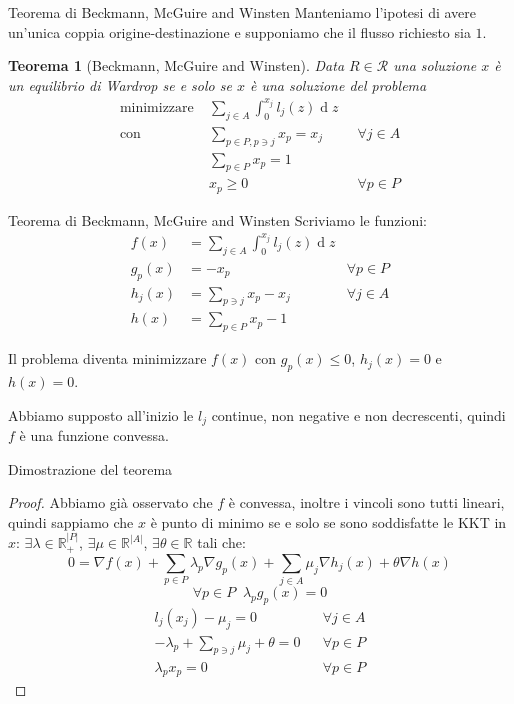 \documentclass{beamer}
\newcounter{counter1}
\theoremstyle{plain}
\newtheorem{myteo}[counter1]{Teorema}
\theoremstyle{definition}
\theoremstyle{remark}
\newcommand{\abs}[1]{\left|#1\right|}
\DeclareMathOperator{\de}{d}
\begin{document}
\begin{frame}{Teorema di Beckmann, McGuire and Winsten}
  Manteniamo l'ipotesi di avere un'unica coppia origine-destinazione e
  supponiamo che il flusso richiesto sia $1$.
  \begin{myteo}[Beckmann, McGuire and Winsten]
    Data $R\in \mathcal{R}$ una soluzione $x$ è un equilibrio di
    Wardrop se e solo se $x$ è una soluzione del problema
    \begin{align*}
        \text{minimizzare} \;&  \sum _{j\in A} \int _0 ^ {x_j}
        l_j(z)\de z \\
        \text{con} \;& \sum _{p\in P, p\ni j} x_p = x_j&\;\; \forall j\in
        A\\
        & \sum _{p\in P} x_p = 1 \\
        & x_p \ge 0&\;\;\forall p\in P        
    \end{align*}
  \end{myteo}
\end{frame}

\begin{frame}{Teorema di Beckmann, McGuire and Winsten}
  Scriviamo le funzioni:
  \begin{align*}
    f(x) &= \sum _{j\in A} \int _0 ^ {x_j} l_j(z)\de z \\
    g_p(x) &= -x_p & \forall p\in P \\
    h_j(x) &= \sum _{p\ni j} x_p -x_j & \forall j\in A\\
    h(x) &= \sum _{p\in P} x_p -1
  \end{align*}
  
  Il problema diventa minimizzare $f(x)$ con $g_p(x) \le 0$, $h_j(x)
  =0$ e $h(x) =0$.

  Abbiamo supposto all'inizio le $l_j$ continue, non negative e non
  decrescenti, quindi $f$ è una funzione convessa.
\end{frame}

\begin{frame}{Dimostrazione del teorema}
  \begin{proof}
    \renewcommand{\qedsymbol}{} Abbiamo già osservato che $f$ è
    convessa, inoltre i vincoli sono tutti lineari, quindi sappiamo
    che $x$ è punto di minimo se e solo se sono soddisfatte le KKT in
    $x$: $\exists \lambda \in \mathbb{R}_+^{\abs{P}}$,
    $\exists \mu \in \mathbb{R}^{\abs{A}}$,
    $\exists \theta \in \mathbb{R}$ tali che:
    \[ 0 = \nabla f(x) + \sum_{p\in P}\lambda _p \nabla g_p(x) + \sum _{j\in
        A} \mu _j \nabla h_j(x) + \theta \nabla h(x) \]
    \[ \forall p\in P\;\; \lambda _p g_p(x) = 0 \]
    \vspace{-20px}
    \begin{align*}
      l_j(x_j) - \mu _j =0 && \forall j\in A \\
      -\lambda _p + \sum _{p\ni j}\mu _j + \theta =0 && \forall p \in
                                                        P\\
      \lambda _p x_p =0 && \forall p\in P
    \end{align*}
  \end{proof}
\end{frame}
\end{document}
